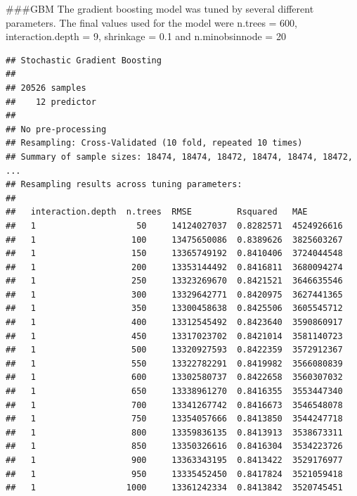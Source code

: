 \documentclass[11pt,]{article}
\newenvironment{Shaded}{\begin{snugshade}}{\end{snugshade}}
\newcommand{\KeywordTok}[1]{\textcolor[rgb]{0.13,0.29,0.53}{\textbf{#1}}}
\newcommand{\NormalTok}[1]{#1}
\newcommand{\OperatorTok}[1]{\textcolor[rgb]{0.81,0.36,0.00}{\textbf{#1}}}
\newcommand{\StringTok}[1]{\textcolor[rgb]{0.31,0.60,0.02}{#1}}
\begin{document}
\#\#\#GBM The gradient boosting model was tuned by several different
parameters. The final values used for the model were n.trees = 600,
interaction.depth = 9, shrinkage = 0.1 and n.minobsinnode = 20

\begin{Shaded}
\end{Shaded}

\begin{verbatim}
## Stochastic Gradient Boosting 
## 
## 20526 samples
##    12 predictor
## 
## No pre-processing
## Resampling: Cross-Validated (10 fold, repeated 10 times) 
## Summary of sample sizes: 18474, 18474, 18472, 18474, 18474, 18472, ... 
## Resampling results across tuning parameters:
## 
##   interaction.depth  n.trees  RMSE         Rsquared   MAE       
##   1                    50     14124027037  0.8282571  4524926616
##   1                   100     13475650086  0.8389626  3825603267
##   1                   150     13365749192  0.8410406  3724044548
##   1                   200     13353144492  0.8416811  3680094274
##   1                   250     13323269670  0.8421521  3646635546
##   1                   300     13329642771  0.8420975  3627441365
##   1                   350     13300458638  0.8425506  3605545712
##   1                   400     13312545492  0.8423640  3590860917
##   1                   450     13317023702  0.8421014  3581140723
##   1                   500     13320927593  0.8422359  3572912367
##   1                   550     13322782291  0.8419982  3566080839
##   1                   600     13302580737  0.8422658  3560307032
##   1                   650     13338961270  0.8416355  3553447340
##   1                   700     13341267742  0.8416673  3546548078
##   1                   750     13354057666  0.8413850  3544247718
##   1                   800     13359836135  0.8413913  3538673311
##   1                   850     13350326616  0.8416304  3534223726
##   1                   900     13363343195  0.8413422  3529176977
##   1                   950     13335452450  0.8417824  3521059418
##   1                  1000     13361242334  0.8413842  3520745451

\end{verbatim}
\end{document}
